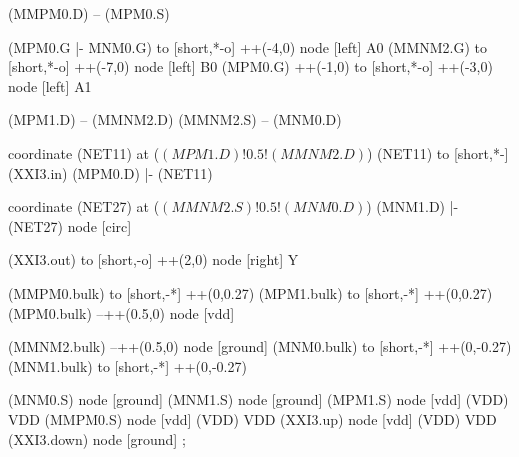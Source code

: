 \begin{circuitikz}[american]
	(MMPM0.D) -- (MPM0.S)
	
	(MPM0.G |- MNM0.G) to [short,*-o] ++(-4,0) node [left] {A0}
	(MMNM2.G) to [short,*-o] ++(-7,0) node [left] {B0}
	(MPM0.G) ++(-1,0) to [short,*-o] ++(-3,0) node [left] {A1}
	
	(MPM1.D) -- (MMNM2.D)
	(MMNM2.S) -- (MNM0.D)
	
	coordinate (NET11) at ($(MPM1.D)!0.5!(MMNM2.D)$)
	(NET11) to [short,*-] (XXI3.in)
	(MPM0.D) |- (NET11)
	
	coordinate (NET27) at ($(MMNM2.S)!0.5!(MNM0.D)$)
	(MNM1.D) |- (NET27) node [circ] {}
	
	(XXI3.out) to [short,-o] ++(2,0) node [right] {Y}
	
	(MMPM0.bulk) to [short,-*] ++(0,0.27)
	(MPM1.bulk) to [short,-*] ++(0,0.27)	
	(MPM0.bulk) --++(0.5,0) node [vdd]{}
	
	(MMNM2.bulk) --++(0.5,0) node [ground]{}
	(MNM0.bulk) to [short,-*] ++(0,-0.27)
	(MNM1.bulk) to [short,-*] ++(0,-0.27)	


	(MNM0.S) node [ground] {}
	(MNM1.S) node [ground] {}
	(MPM1.S) node [vdd] (VDD) {VDD}
	(MMPM0.S) node [vdd] (VDD) {VDD}
	(XXI3.up) node [vdd] (VDD) {VDD}
	(XXI3.down) node [ground] {}
;

\end{circuitikz}
